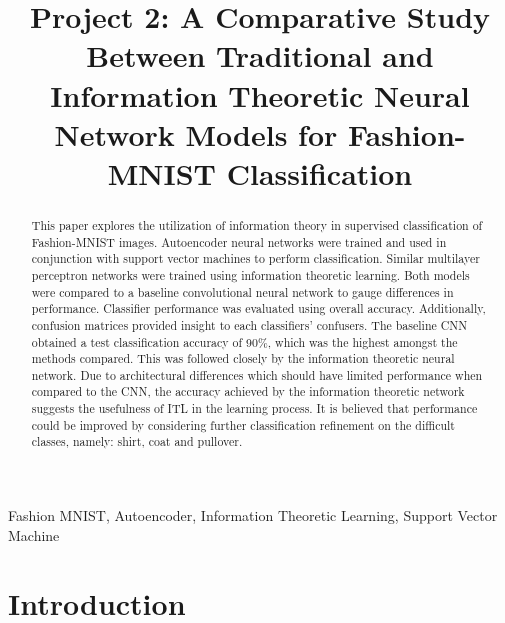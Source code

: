 \documentclass[conference]{IEEEtran}
\begin{document}
\title{Project 2: A Comparative Study Between Traditional and Information Theoretic Neural Network Models for Fashion-MNIST Classification}
\author{

}

\maketitle


\begin{abstract}
	This paper explores the utilization of information theory in supervised classification of Fashion-MNIST images.  Autoencoder neural networks were trained and used in conjunction with support vector machines to perform classification.  Similar multilayer perceptron networks were trained using information theoretic learning.  Both models were compared to a baseline convolutional neural network to gauge differences in performance.  Classifier performance was evaluated using overall accuracy.  Additionally, confusion matrices provided insight to each classifiers' confusers.  The baseline CNN obtained a test classification accuracy of 90\%, which was the highest amongst the methods compared.  This was followed closely by the information theoretic neural network.  Due to architectural differences which should have limited performance when compared to the CNN, the accuracy achieved by the information theoretic network suggests the usefulness of ITL in the learning process.  It is believed that performance could be improved by considering further classification refinement on the difficult classes, namely: shirt, coat and pullover.
\end{abstract} 

\begin{IEEEkeywords}
Fashion MNIST, Autoencoder, Information Theoretic Learning, Support Vector Machine
\end{IEEEkeywords}

\section{Introduction} 
\end{document}
